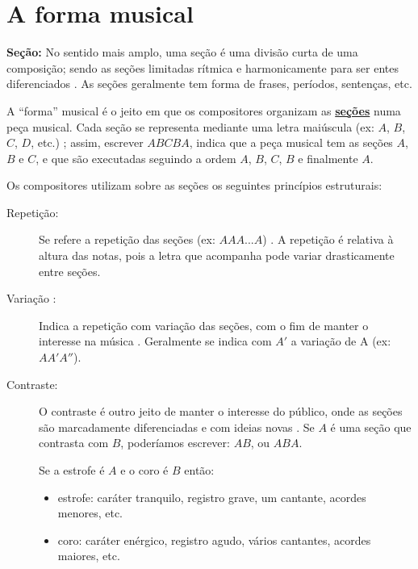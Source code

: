 


\section{A forma musical}
\label{sec:FormaMusical}

\begin{tcbinformation} 
\textbf{Seção:}
\label{ref:Secao}
No sentido mais amplo, uma seção é uma divisão curta de uma composição;
sendo as seções limitadas rítmica e harmonicamente para ser entes diferenciados \cite[pp. 174]{baker1895dictionary}.
As seções geralmente tem forma de frases, períodos, sentenças, etc. 
\end{tcbinformation} 

A ``forma'' musical é o jeito em que os compositores organizam as \hyperref[ref:Secao]{\textbf{seções}} numa peça musical.
Cada seção se representa mediante uma letra maiúscula (ex: $A$, $B$, $C$, $D$, etc.) \cite[pp. 71]{bennett1993elementos};
assim, escrever $ABCBA$, indica que a peça musical tem as seções $A$, $B$ e $C$,
e que são executadas seguindo a ordem $A$, $B$, $C$, $B$ e finalmente $A$.


Os compositores utilizam sobre as seções os seguintes princípios estruturais:
\begin{description}
\item[Repetição:] Se refere a repetição das seções (ex: $AAA...A$) 
\cite[pp. 71]{bennett1993elementos} \cite[pp. 88]{howard1991aprendendo} \cite[pp. 53]{colluraimprovisacao} 
\cite[pp. 85]{holland2013music}.
A repetição é relativa à altura das notas, 
pois a letra que acompanha pode variar drasticamente entre seções.
 
\item[Variação :] Indica a repetição com variação das seções, 
 com o fim de manter o interesse na música
\cite[pp. 71]{bennett1993elementos} \cite[pp. 88]{howard1991aprendendo} \cite[pp. 53]{colluraimprovisacao}.
Geralmente se indica com $A'$ a variação de A (ex: $AA'A''$).

\item[Contraste:] O contraste é outro jeito de manter o interesse do 
público, onde as seções são  marcadamente diferenciadas e com ideias novas
\cite[pp. 71]{bennett1993elementos} \cite[pp. 88]{howard1991aprendendo} 
\cite[pp. 53]{colluraimprovisacao}  \cite[pp. 85]{holland2013music}.
Se $A$ é uma seção que contrasta com $B$, poderíamos escrever: $AB$, ou $ABA$.
\begin{example}
Se a estrofe é $A$ e o coro é $B$ então:
\begin{itemize} 
\item estrofe: caráter tranquilo, registro grave, um cantante, acordes menores, etc.
\item coro: caráter enérgico, registro agudo, vários cantantes, acordes maiores, etc.
\end{itemize}
\end{example}
\end{description} 

